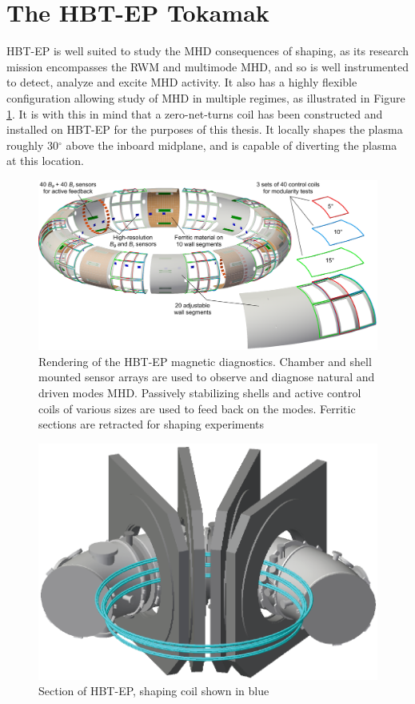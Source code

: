 \documentclass[aps,prl,twocolumn,superscriptaddress,groupedaddress]{revtex4}  %
\begin{document}
\section{The HBT-EP Tokamak}
	HBT-EP is well suited to study the MHD consequences of shaping, as its research mission encompasses the RWM and multimode MHD, and so is well instrumented to detect, analyze and excite MHD activity.  It also has a highly flexible configuration allowing study of MHD in multiple regimes, as illustrated in Figure \ref{schematic}. It is with this in mind that a zero-net-turns coil has been constructed and installed on HBT-EP for the purposes of this thesis.  It locally shapes the plasma roughly 30${^\circ}$ above the inboard midplane, and is capable of diverting the plasma at this location.
	\begin{figure}[htb]
	\centering
	\includegraphics[scale=.25]{../Plots/Plasma_with_sensors_FWall_concept_WithCCview.png}
	\caption{Rendering of the HBT-EP magnetic diagnostics.  Chamber and shell mounted sensor arrays are used to observe and diagnose natural and driven modes MHD.  Passively stabilizing shells and active control coils of various sizes are used to feed back on the modes.  Ferritic sections are retracted for shaping experiments}
	\label{schematic}
	\end{figure}
	
\begin{figure}[htb]
	\centering
\includegraphics[scale=.35]{../Plots/HBT_section_cropped.png}\caption{Section of HBT-EP, shaping coil shown in blue}
	\label{Coil_HBT_Section}
	\end{figure}
	
\end{document}
